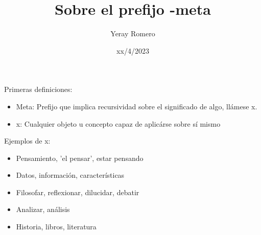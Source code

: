 \title{Sobre el prefijo -meta}
\date{xx/4/2023}
\author{Yeray Romero}



    \maketitle
    
    Primeras definiciones: 
    \begin{itemize}
    \item Meta: Prefijo que implica recursividad sobre el significado de algo, llámese x.
    \item x: Cualquier objeto u concepto capaz de aplicárse sobre sí mismo
    \end{itemize}
    Ejemplos de x:
    \begin{itemize}
    \item Pensamiento, 'el pensar', estar pensando
    \item Datos, información, características
    \item Filosofar, reflexionar, dilucidar, debatir
    \item Analizar, análisis
    \item Historia, libros, literatura
    \end{itemize}


